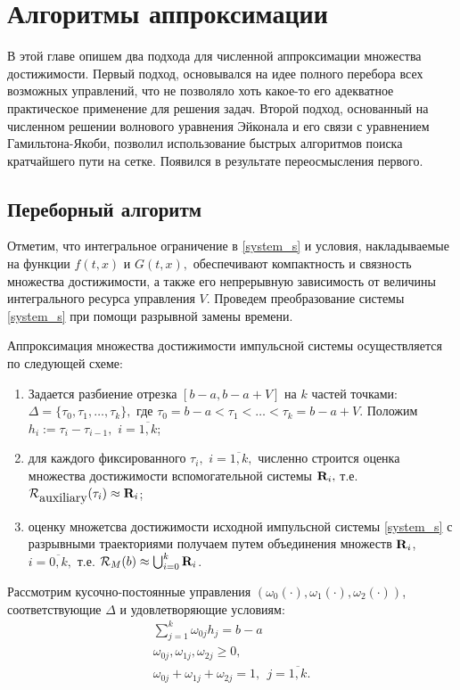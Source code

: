 \chapter{Алгоритмы аппроксимации}
\label{ch:algrhtms}


В этой главе опишем два подхода для численной аппроксимации множества
достижимости. Первый подход, основывался на идее полного перебора всех
возможных управлений, что не позволяло хоть какое-то его адекватное
практическое применение для решения задач.  Второй подход, основанный
на численном решении волнового уравнения Эйконала и его связи с
уравнением Гамильтона-Якоби, позволил использование быстрых алгоритмов
поиска кратчайшего пути на сетке. Появился в результате переосмысления
первого.

\section{Переборный алгоритм}
\label{sec:simple_alg}

Отметим, что интегральное ограничение в
\eqref{system_s} и условия, накладываемые на функции $f(t,x)$ и $G(t,x),$
обеспечивают компактность и связность множества достижимости, а
также его непрерывную зависимость от величины интегрального
ресурса управления $V$. Проведем преобразование системы
\eqref{system_s} при помощи разрывной замены времени. 

Аппроксимация множества достижимости импульсной системы осуществляется по
следующей схеме:
\begin{enumerate}
\item Задается разбиение отрезка $[b-a,b-a+V]$ на $k$ частей точками:
  $ \Delta=\big\{ \tau_{0}, \tau_{1}, \ldots, \tau_{k} \big\}, $ где
  $\tau_{0}=b-a< \tau_{1}< \ldots < \tau_{k}=b-a+V$. Положим
  $h_i:=\tau_{i}-\tau_{i-1},$ $i=\overline{1,k}$;
\item для каждого фиксированного $\tau_{i},$ $i=\overline{1,k},$
  численно строится оценка множества достижимости вспомогательной
  системы $\mbox{\bf R}_i ,$ т.е.
  ${\mathcal R}_{\mbox{\rm auxiliary}}(\tau_{i}) \approx \mbox{\bf
    R}_i$;
\item оценку множетсва достижимости исходной импульсной системы \eqref{system_s} с
  разрывными траекториями получаем путем объединения множеств
  $\mbox{\bf R}_i$, $i=\overline{0,k},$ т.е.
  $ {\mathcal R}_M(b)\approx \bigcup_{i=0}^k \mbox{\bf R}_i$.
\end{enumerate}


Рассмотрим кусочно-постоянные управления
$(\omega_0(\cdot),\omega_1(\cdot),\omega_2(\cdot))$, соответствующие
$\Delta$ и удовлетворяющие условиям:
\begin{equation*}
  \begin{array}{l}
    \sum_{j=1}^k \omega_{0j}h_j=b-a\\
    \omega_{0j}, \omega_{1j}, \omega_{2j} \geq 0,\\ 
    \omega_{0j}+ \omega_{1j}+ \omega_{2j} =1, \ \ j=\overline{1,k}.
  \end{array}
\end{equation*}

